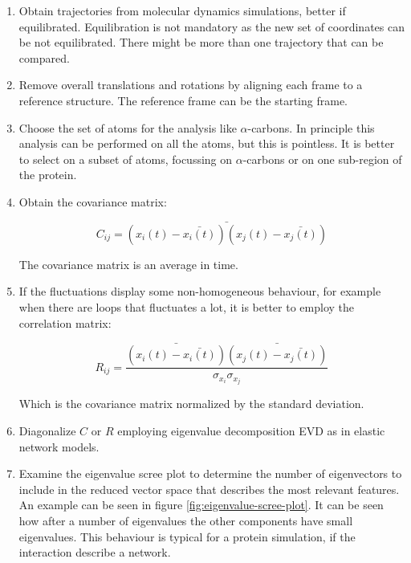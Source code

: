 \begin{enumerate}
	\item Obtain trajectories from molecular dynamics simulations, better if equilibrated.
		Equilibration is not mandatory as the new set of coordinates can be not equilibrated.
		There might be more than one trajectory that can be compared.
	\item Remove overall translations and rotations by aligning each frame to a reference structure.
		The reference frame can be the starting frame.
	\item Choose the set of atoms for the analysis like $\alpha$-carbons.
		In principle this analysis can be performed on all the atoms, but this is pointless.
		It is better to select on a subset of atoms, focussing on $\alpha$-carbons or on one sub-region of the protein.
	\item Obtain the covariance matrix:

		$$C_{ij} = \bar{(x_i(t) - \bar{x_i(t)})(x_j(t)-\bar{x_j(t)})}$$

		The covariance matrix is an average in time.
	\item If the fluctuations display some non-homogeneous behaviour, for example when there are loops that fluctuates a lot, it is better to employ the correlation matrix:

		$$R_{ij} = \frac{\bar{(x_i(t)-\bar{x_i(t)})}\bar{(x_j(t)-\bar{x_j(t)})}}{\sigma_{x_i}\sigma_{x_j}}$$

		Which is the covariance matrix normalized by the standard deviation.
	\item Diagonalize $C$ or $R$ employing eigenvalue decomposition EVD as in elastic network models.
	\item Examine the eigenvalue scree plot to determine the number of eigenvectors to include in the reduced vector space that describes the most relevant features.
		An example can be seen in figure \ref{fig:eigenvalue-scree-plot}.
		It can be seen how after a number of eigenvalues the other components have small eigenvalues.
		This behaviour is typical for a protein simulation, if the interaction describe a network.


\end{enumerate}
